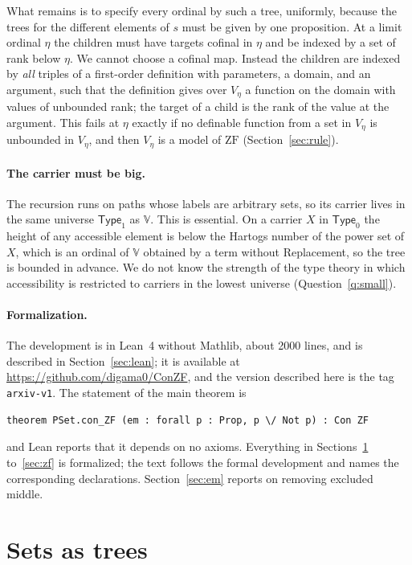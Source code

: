\documentclass[10pt]{article}
\theoremstyle{definition}
\theoremstyle{remark}
\newcommand{\Type}{\mathsf{Type}}
\newcommand{\ZF}{\mathrm{ZF}}
\newcommand{\V}{\mathbb{V}}
\newcommand{\lean}[1]{\texttt{#1}}
\begin{document}
What remains is to specify every ordinal by such a tree, uniformly,
because the trees for the different elements of $s$ must be given by
one proposition. At a limit ordinal $\eta$ the children must have targets
cofinal in $\eta$ and be indexed by a set of rank below $\eta$. We cannot
choose a cofinal map. Instead the children are indexed by \emph{all}
triples of a first-order definition with parameters, a domain, and an
argument, such that the definition gives over $V_\eta$ a function on the
domain with values of unbounded rank; the target of a child is the rank
of the value at the argument. This fails at $\eta$ exactly if no definable
function from a set in $V_\eta$ is unbounded in $V_\eta$, and then $V_\eta$ is a
model of $\ZF$ (Section~\ref{sec:rule}).

\paragraph{The carrier must be big.}
The recursion runs on paths whose labels are arbitrary sets, so its
carrier lives in the same universe $\Type_1$ as $\V$. This is essential.
On a carrier $X$ in $\Type_0$ the height of any accessible element is
below the Hartogs number of the power set of $X$, which is an ordinal of
$\V$ obtained by a term without Replacement, so the tree is bounded in
advance.
We do not know the strength of the type theory in which accessibility is
restricted to carriers in the lowest universe
(Question~\ref{q:small}).

\paragraph{Formalization.}
The development is in Lean~4 without Mathlib, about 2000 lines, and
is described in Section~\ref{sec:lean}; it is available at
\url{https://github.com/digama0/ConZF}, and the version described here
is the tag \lean{arxiv-v1}. The statement of the main
theorem is
\begin{verbatim}
theorem PSet.con_ZF (em : forall p : Prop, p \/ Not p) : Con ZF
\end{verbatim}
and Lean reports that it depends on no axioms. Everything in
Sections~\ref{sec:sets} to~\ref{sec:zf} is formalized; the text follows
the formal development and names the corresponding declarations.
Section~\ref{sec:em} reports on removing excluded middle.

\section{Sets as trees}\label{sec:sets}
\end{document}
